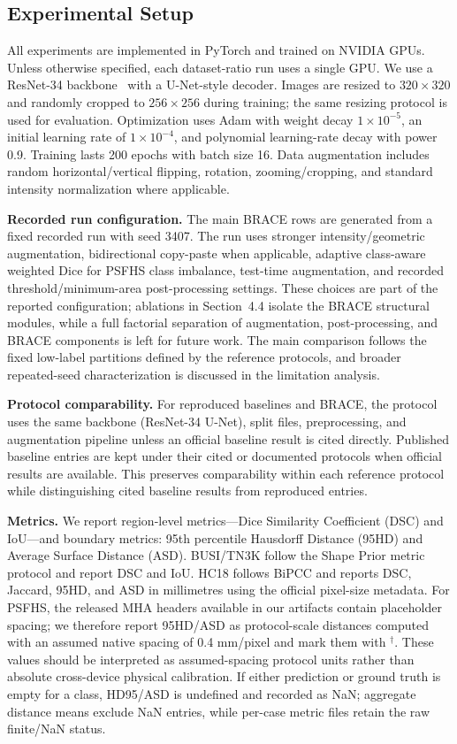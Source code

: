 \documentclass[a4paper,fleqn]{cas-dc}
\begin{document}
\subsection{Experimental Setup}

All experiments are implemented in PyTorch and trained on NVIDIA GPUs. Unless otherwise specified, each dataset-ratio run uses a single GPU. We use a ResNet-34 backbone~\cite{b6} with a U-Net-style decoder. Images are resized to $320 \times 320$ and randomly cropped to $256 \times 256$ during training; the same resizing protocol is used for evaluation. Optimization uses Adam with weight decay $1 \times 10^{-5}$, an initial learning rate of $1 \times 10^{-4}$, and polynomial learning-rate decay with power 0.9. Training lasts 200 epochs with batch size 16. Data augmentation includes random horizontal/vertical flipping, rotation, zooming/cropping, and standard intensity normalization where applicable.

\textbf{Recorded run configuration.} The main BRACE rows are generated from a fixed recorded run with seed 3407. The run uses stronger intensity/geometric augmentation, bidirectional copy-paste when applicable, adaptive class-aware weighted Dice for PSFHS class imbalance, test-time augmentation, and recorded threshold/minimum-area post-processing settings. These choices are part of the reported configuration; ablations in Section~4.4 isolate the BRACE structural modules, while a full factorial separation of augmentation, post-processing, and BRACE components is left for future work. The main comparison follows the fixed low-label partitions defined by the reference protocols, and broader repeated-seed characterization is discussed in the limitation analysis.

\textbf{Protocol comparability.} For reproduced baselines and BRACE, the protocol uses the same backbone (ResNet-34 U-Net), split files, preprocessing, and augmentation pipeline unless an official baseline result is cited directly. Published baseline entries are kept under their cited or documented protocols when official results are available. This preserves comparability within each reference protocol while distinguishing cited baseline results from reproduced entries.

\textbf{Metrics.} We report region-level metrics—Dice Similarity Coefficient (DSC) and IoU—and boundary metrics: 95th percentile Hausdorff Distance (95HD) and Average Surface Distance (ASD). BUSI/TN3K follow the Shape Prior metric protocol and report DSC and IoU. HC18 follows BiPCC and reports DSC, Jaccard, 95HD, and ASD in millimetres using the official pixel-size metadata. For PSFHS, the released MHA headers available in our artifacts contain placeholder spacing; we therefore report 95HD/ASD as protocol-scale distances computed with an assumed native spacing of 0.4 mm/pixel and mark them with $^\dagger$. These values should be interpreted as assumed-spacing protocol units rather than absolute cross-device physical calibration. If either prediction or ground truth is empty for a class, HD95/ASD is undefined and recorded as NaN; aggregate distance means exclude NaN entries, while per-case metric files retain the raw finite/NaN status.
\end{document}
